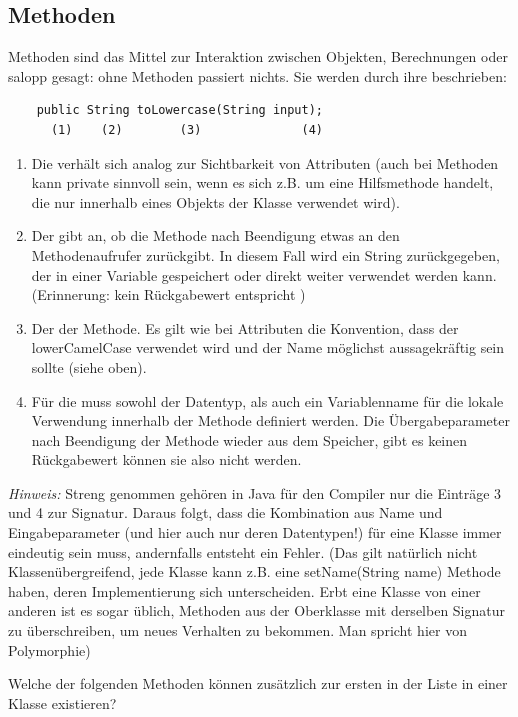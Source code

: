 \documentclass{article}
\begin{document}
\subsection{Methoden}
Methoden sind das Mittel zur Interaktion zwischen Objekten, Berechnungen oder salopp gesagt: ohne Methoden passiert nichts. Sie werden durch ihre  beschrieben:
\begin{verbatim}
    public String toLowercase(String input);
      (1)    (2)        (3)              (4)
\end{verbatim}
\begin{enumerate}
    \item Die  verhält sich analog zur Sichtbarkeit von Attributen (auch bei Methoden kann private sinnvoll sein, wenn es sich z.B. um eine Hilfsmethode handelt, die nur innerhalb eines Objekts der Klasse verwendet wird). 
    \item Der  gibt an, ob die Methode nach Beendigung etwas an den Methodenaufrufer zurückgibt. In diesem Fall wird ein String zurückgegeben, der in einer Variable gespeichert oder direkt weiter verwendet werden kann. (Erinnerung: kein Rückgabewert entspricht )
    \item Der  der Methode. Es gilt wie bei Attributen die Konvention, dass der lowerCamelCase verwendet wird und der Name möglichst aussagekräftig sein sollte (siehe oben).
    \item Für die  muss sowohl der Datentyp, als auch ein Variablenname für die lokale Verwendung innerhalb der Methode definiert werden. Die Übergabeparameter  nach Beendigung der Methode wieder aus dem Speicher, gibt es keinen Rückgabewert können sie also nicht  werden.
\end{enumerate}
\textit{Hinweis:} Streng genommen gehören in Java für den Compiler nur die Einträge 3 und 4 zur Signatur. Daraus folgt, dass die Kombination aus Name und Eingabeparameter (und hier auch nur deren Datentypen!) für eine Klasse immer eindeutig sein muss, andernfalls entsteht ein Fehler. (Das gilt natürlich nicht Klassenübergreifend, jede Klasse kann z.B. eine setName(String name) Methode haben, deren Implementierung sich unterscheiden. Erbt eine Klasse von einer anderen ist es sogar üblich, Methoden aus der Oberklasse mit derselben Signatur zu überschreiben, um neues Verhalten zu bekommen. Man spricht hier von Polymorphie) \\

\begin{task}{2}
Welche der folgenden Methoden können zusätzlich zur ersten in der Liste in einer Klasse existieren? \\
\end{task}
\end{document}
